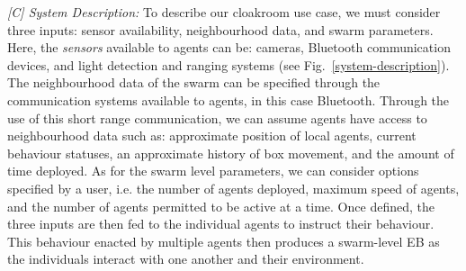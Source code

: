 \documentclass[runningheads]{llncs}
\begin{document}
\emph{[C] System Description:}
To describe our cloakroom use case, we must consider three inputs: sensor availability, neighbourhood data, and swarm parameters. 
Here, the \emph{sensors} available to agents can be: cameras, Bluetooth communication devices, and light detection and ranging systems (see Fig.~\ref{system-description}). 
The neighbourhood data of the swarm can be specified through the communication systems available to agents, in this case Bluetooth. 
Through the use of this short range communication, we can assume agents have access to neighbourhood data such as: approximate position of local agents, current behaviour statuses, an approximate history of box movement, and the amount of time deployed. 
As for the swarm level parameters, we can consider options specified by a user, i.e. the number of agents deployed, maximum speed of agents, and the number of agents permitted to be active at a time.
Once defined, the three inputs are then fed to the individual agents to instruct their behaviour. This behaviour enacted by multiple agents then produces a swarm-level EB as the individuals interact with one another and their environment.

\end{document}
